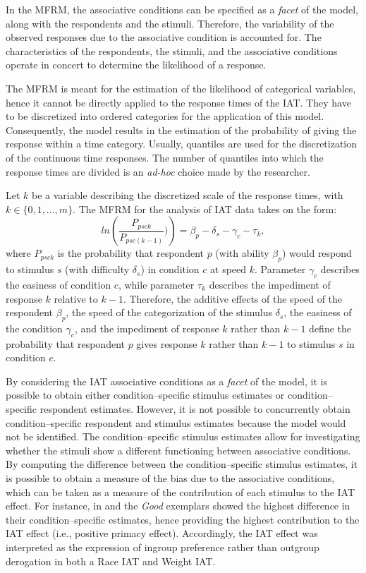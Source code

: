 \documentclass[12pt]{book}
\begin{document}
In the MFRM, the associative conditions can be specified as a \emph{facet} of the model, along with the respondents and the stimuli. Therefore, the variability of the observed responses due to the associative condition is accounted for. The characteristics of the respondents, the stimuli, and the associative conditions operate in concert to determine the likelihood of a response.


The MFRM is meant for the estimation of the likelihood of categorical variables, hence it cannot be directly applied to the response times of the IAT. They have to be discretized into ordered categories for the application of this model. 
Consequently, the model results in the estimation of the probability of giving the response within a time category.
Usually, quantiles are used for the discretization of the continuous time responses. The number of quantiles into which the response times are divided is an \emph{ad-hoc} choice made by the researcher.

Let $k$ be a variable describing the discretized scale of the response times, with $k \in \{0,1, \ldots, m\}$. The MFRM for the analysis of IAT data takes on the form: 
\begin{equation}
	ln\left(\frac{P_{psck}}{P_{psc(k-1)}})\right) = \beta_p - \delta_s - \gamma_c -\tau_k,
\end{equation}
where $P_{psck}$ is the probability that respondent $p$ (with ability $\beta_p$) would respond to stimulus $s$ (with difficulty $\delta_s$) in condition $c$ at speed $k$. Parameter $\gamma_c$ describes the easiness of condition $c$, while parameter $\tau_k$ describes the impediment of response $k$ relative to $k-1$. 
Therefore, the additive effects of the speed of the respondent $\beta_p$, the speed of the categorization of the stimulus $\delta_s$, the easiness of the condition $\gamma_c$, and the impediment of response $k$ rather than $k-1$ define the probability that respondent $p$ gives response $k$ rather than $k-1$ to stimulus $s$ in condition $c$.

By considering the IAT associative conditions as a \emph{facet} of the model, it is possible to obtain either condition--specific stimulus estimates or condition--specific respondent estimates. 
However, it is not possible to concurrently obtain condition--specific respondent and stimulus estimates because the model would not be identified.
The condition--specific stimulus estimates allow for investigating whether the stimuli show a different functioning between associative conditions. By computing the difference between the condition--specific stimulus estimates, it is possible to obtain a measure of the bias due to the associative conditions, which can be taken as a measure of the contribution of each stimulus to the IAT effect.
For instance, in  and \cite{anselmi2013} the \emph{Good} exemplars showed the highest difference in their condition--specific estimates, hence providing the highest contribution to the IAT effect (i.e., positive primacy effect). Accordingly, the IAT effect was interpreted as the expression of ingroup preference rather than outgroup derogation in both a Race IAT and Weight IAT. 
\end{document}
